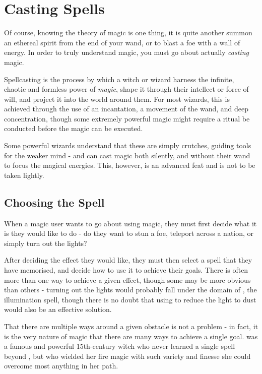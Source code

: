 

\chapter{Casting Spells} \label{S:CastingSpells}

Of course, knowing the theory of magic is one thing, it is quite another summon an ethereal spirit from the end of your wand, or to blast a foe with a wall of energy. In order to truly understand magic, you must go about actually {\it casting} magic. 

Spellcasting is the process by which a witch or wizard harness the infinite, chaotic and formless power of {\it magic}, shape it through their intellect or force of will, and project it into the world around them. For most wizards, this is achieved through the use of an incantation, a movement of the wand, and deep concentration, though some extremely powerful magic might require a ritual be conducted before the magic can be executed. 

Some powerful wizards understand that these are simply crutches, guiding tools for the weaker mind - and can cast magic both silently, and without their wand to focus the magical energies. This, however, is an advanced feat and is not to be taken lightly. 

\section{Choosing the Spell}

When a magic user wants to go about using magic, they must first decide what it is they would like to do - do they want to stun a foe, teleport across a nation, or simply turn out the lights?

After deciding the effect they would like, they must then select a spell that they have memorised, and decide how to use it to achieve their goals. There is often more than one way to achieve a given effect, though some may be more obvious than others - turning out the lights would probably fall under the domain of , the illumination spell, though there is no doubt that using  to reduce the light to dust would also be an effective solution. 

That there are multiple ways around a given obstacle is not a problem - in fact, it is the very nature of magic that there are many ways to achieve a single goal.  was a famous and powerful 15th-century witch who never learned a single spell beyond , but who wielded her fire magic with such variety and finesse she could overcome most anything in her path. 

